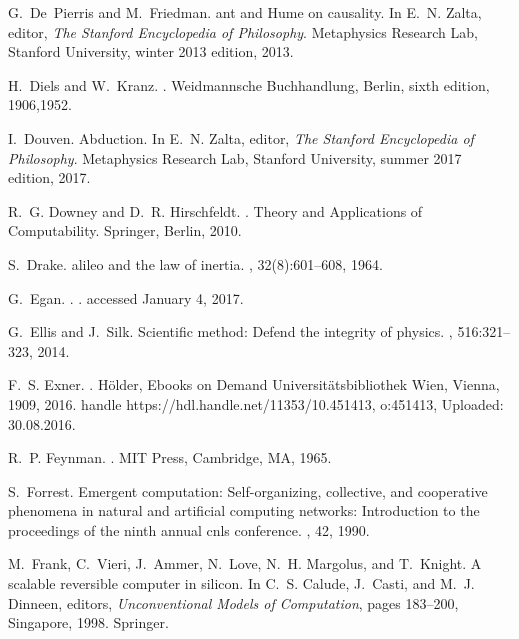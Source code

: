 \documentclass[12pt]{article}
\begin{document}
\begin{thebibliography}{10}
G.~De~Pierris and M.~Friedman.
ant and {H}ume on causality.
\newblock In E.~N. Zalta, editor, {\em The {S}tanford Encyclopedia of
  Philosophy}. Metaphysics Research Lab, Stanford University, winter 2013
  edition, 2013.

H.~Diels and W.~Kranz.
.
\newblock Weidmannsche Buchhandlung, Berlin, sixth edition, 1906,1952.

I.~Douven.
\newblock Abduction.
\newblock In E.~N. Zalta, editor, {\em The Stanford Encyclopedia of
  Philosophy}. Metaphysics Research Lab, Stanford University, summer 2017
  edition, 2017.

R.~G. Downey and D.~R. Hirschfeldt.
.
\newblock Theory and Applications of Computability. Springer, Berlin, 2010.

S.~Drake.
alileo and the law of inertia.
, 32(8):601--608, 1964.

G.~Egan.
.
.
\newblock accessed January 4, 2017.

G.~Ellis and J.~Silk.
\newblock Scientific method: Defend the integrity of physics.
, 516:321--323, 2014.

F.~S. Exner.
.
\newblock H\"older, Ebooks on Demand Universit\"atsbibliothek Wien, Vienna,
  1909, 2016.
\newblock handle https://hdl.handle.net/11353/10.451413, o:451413, Uploaded:
  30.08.2016.

R.~P. Feynman.
.
\newblock MIT Press, Cambridge, MA, 1965.

S.~Forrest.
\newblock Emergent computation: Self-organizing, collective, and cooperative
  phenomena in natural and artificial computing networks: Introduction to the
  proceedings of the ninth annual cnls conference.
, 42, 1990.

M.~Frank, C.~Vieri, J.~Ammer, N.~Love, N.~H. Margolus, and T.~Knight.
\newblock A scalable reversible computer in silicon.
\newblock In C.~S. Calude, J.~Casti, and M.~J. Dinneen, editors, {\em
  Unconventional Models of Computation}, pages 183--200, Singapore, 1998.
  Springer.


\end{thebibliography}
\end{document}
